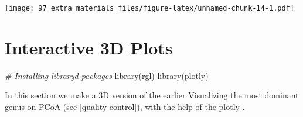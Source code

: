 \documentclass[
]{book}
\newenvironment{Shaded}{\begin{snugshade}}{\end{snugshade}}
\newcommand{\AttributeTok}[1]{\textcolor[rgb]{0.77,0.63,0.00}{#1}}
\newcommand{\CommentTok}[1]{\textcolor[rgb]{0.56,0.35,0.01}{\textit{#1}}}
\newcommand{\FunctionTok}[1]{\textcolor[rgb]{0.00,0.00,0.00}{#1}}
\newcommand{\NormalTok}[1]{#1}
\newcommand{\SpecialCharTok}[1]{\textcolor[rgb]{0.00,0.00,0.00}{#1}}
\begin{document}
\texttt{[image: 97\_extra\_materials\_files/figure-latex/unnamed-chunk-14-1.pdf]}

\hypertarget{interactive-3d-plots}{%
\section{Interactive 3D Plots}\label{interactive-3d-plots}}

\begin{Shaded}
\begin{Highlighting}[]
\CommentTok{\# Installing libraryd packages}
\FunctionTok{library}\NormalTok{(rgl)}
\FunctionTok{library}\NormalTok{(plotly)}
\end{Highlighting}
\end{Shaded}

\begin{Shaded}
\end{Shaded}

In this section we make a 3D version of the earlier Visualizing the most dominant genus on PCoA (see \ref{quality-control}), with the help of the plotly \citep{Sievert2020}.
\end{document}
